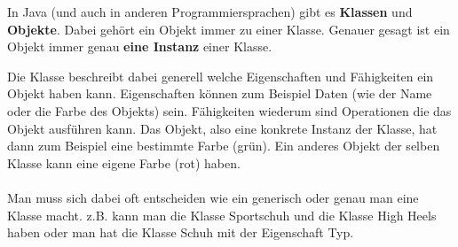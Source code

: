 


\begin{Infobox}
    In Java (und auch in anderen Programmiersprachen) gibt es \textbf{Klassen} und \textbf{Objekte}.
    Dabei gehört ein Objekt immer zu einer Klasse. Genauer gesagt ist ein Objekt immer genau \textbf{eine Instanz} einer Klasse.

    Die Klasse beschreibt dabei generell welche Eigenschaften und Fähigkeiten ein Objekt haben kann.
    Eigenschaften können zum Beispiel Daten (wie der Name oder die Farbe des Objekts) sein.
    Fähigkeiten wiederum sind Operationen die das Objekt ausführen kann.
    Das Objekt, also eine konkrete Instanz der Klasse, hat dann zum Beispiel eine bestimmte Farbe (grün).
    Ein anderes Objekt der selben Klasse kann eine eigene Farbe (rot) haben.
    \paragraph{}
    Man muss sich dabei oft entscheiden wie ein generisch oder genau man eine Klasse macht. z.B. kann man die Klasse Sportschuh und die Klasse High Heels haben oder man hat die Klasse Schuh mit der Eigenschaft Typ.
\end{Infobox}


